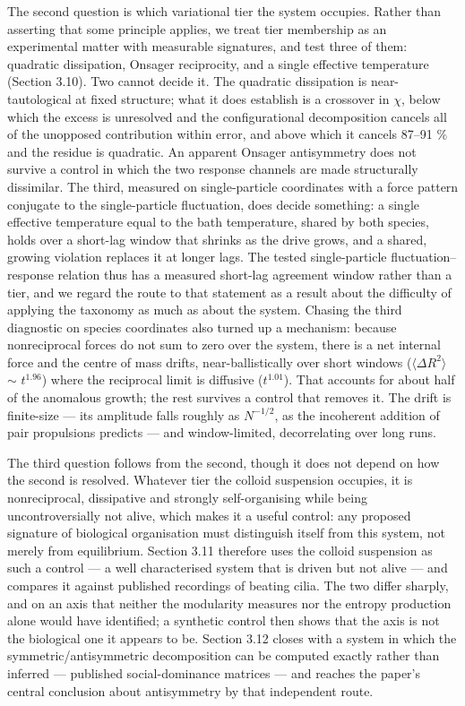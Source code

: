 \documentclass[aps,pre,preprint,superscriptaddress,nofootinbib,longbibliography]{revtex4-2}
\begin{document}
The second question is which variational tier the system occupies. Rather than asserting that some principle applies, we treat tier membership as an experimental matter with measurable signatures, and test three of them: quadratic dissipation, Onsager reciprocity, and a single effective temperature (Section 3.10). Two cannot decide it. The quadratic dissipation is near-tautological at fixed structure; what it does establish is a crossover in $\chi$, below which the excess is unresolved and the configurational decomposition cancels all of the unopposed contribution within error, and above which it cancels 87--91 \% and the residue is quadratic. An apparent Onsager antisymmetry does not survive a control in which the two response channels are made structurally dissimilar. The third, measured on single-particle coordinates with a force pattern conjugate to the single-particle fluctuation, does decide something: a single effective temperature equal to the bath temperature, shared by both species, holds over a short-lag window that shrinks as the drive grows, and a shared, growing violation replaces it at longer lags. The tested single-particle fluctuation--response relation thus has a measured short-lag agreement window rather than a tier, and we regard the route to that statement as a result about the difficulty of applying the taxonomy as much as about the system. Chasing the third diagnostic on species coordinates also turned up a mechanism: because nonreciprocal forces do not sum to zero over the system, there is a net internal force and the centre of mass drifts, near-ballistically over short windows ($\langle \Delta R^2\rangle$ $\sim$ $t^{1.96}$) where the reciprocal limit is diffusive ($t^{1.01}$). That accounts for about half of the anomalous growth; the rest survives a control that removes it. The drift is finite-size --- its amplitude falls roughly as $N^{-1/2}$, as the incoherent addition of pair propulsions predicts --- and window-limited, decorrelating over long runs.

The third question follows from the second, though it does not depend on how the second is resolved. Whatever tier the colloid suspension occupies, it is nonreciprocal, dissipative and strongly self-organising while being uncontroversially not alive, which makes it a useful control: any proposed signature of biological organisation must distinguish itself from this system, not merely from equilibrium. Section 3.11 therefore uses the colloid suspension as such a control --- a well characterised system that is driven but not alive --- and compares it against published recordings of beating cilia. The two differ sharply, and on an axis that neither the modularity measures nor the entropy production alone would have identified; a synthetic control then shows that the axis is not the biological one it appears to be. Section 3.12 closes with a system in which the symmetric/antisymmetric decomposition can be computed exactly rather than inferred --- published social-dominance matrices --- and reaches the paper's central conclusion about antisymmetry by that independent route.
\end{document}

